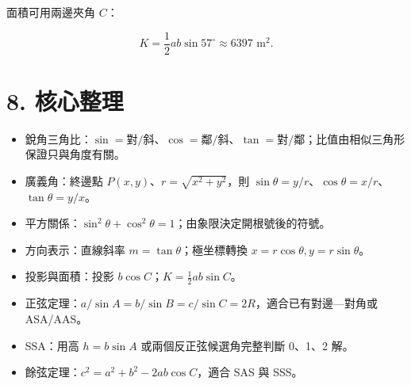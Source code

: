 \documentclass[11pt,a4paper]{article}
\providecommand{\tightlist}{%
  \setlength{\itemsep}{0pt}\setlength{\parskip}{0pt}}
\begin{document}
面積可用兩邊夾角 \(C\)：

\[
   K=\frac12ab\sin57^\circ\approx\boxed{6397\text{ m}^2}.
   \]

\section{8. 核心整理}\label{ux6838ux5fc3ux6574ux7406}

\begin{itemize}
\tightlist
\item
  銳角三角比：\(\sin=\text{對}/\text{斜}\)、\(\cos=\text{鄰}/\text{斜}\)、\(\tan=\text{對}/\text{鄰}\)；比值由相似三角形保證只與角度有關。
\item
  廣義角：終邊點 \(P(x,y)\)、\(r=\sqrt{x^2+y^2}\)，則 \(\sin\theta=y/r\)、\(\cos\theta=x/r\)、\(\tan\theta=y/x\)。
\item
  平方關係：\(\sin^2\theta+\cos^2\theta=1\)；由象限決定開根號後的符號。
\item
  方向表示：直線斜率 \(m=\tan\theta\)；極坐標轉換 \(x=r\cos\theta,y=r\sin\theta\)。
\item
  投影與面積：投影 \(b\cos C\)；\(K=\frac12ab\sin C\)。
\item
  正弦定理：\(a/\sin A=b/\sin B=c/\sin C=2R\)，適合已有對邊---對角或 ASA/AAS。
\item
  SSA：用高 \(h=b\sin A\) 或兩個反正弦候選角完整判斷 0、1、2 解。
\item
  餘弦定理：\(c^2=a^2+b^2-2ab\cos C\)，適合 SAS 與 SSS。
\end{itemize}
\end{document}
